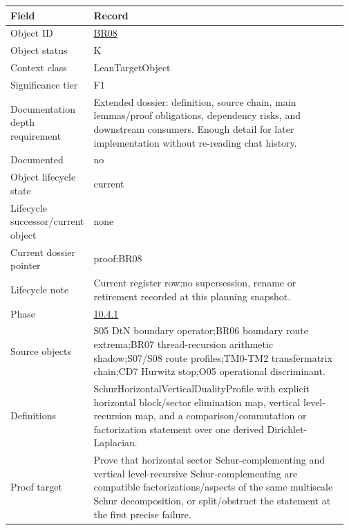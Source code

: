 \begin{longtable}{L{0.16\linewidth} L{0.81\linewidth}}
\hline
\textbf{Field} & \textbf{Record}\\
\hline
Object ID & \hyperlink{object-row-BR08}{BR08}\\
\hline\addlinespace[0.20em]
Object status & K\\
\hline\addlinespace[0.20em]
Context class & LeanTargetObject\\
\hline\addlinespace[0.20em]
Significance tier & F1\\
\hline\addlinespace[0.20em]
Documentation depth requirement & Extended dossier: definition, source chain, main lemmas/\allowbreak{}proof obligations, dependency risks, and downstream consumers. Enough detail for later implementation without re-reading chat history.\\
\hline\addlinespace[0.20em]
Documented & no\\
\hline\addlinespace[0.20em]
Object lifecycle state & current\\
\hline\addlinespace[0.20em]
Lifecycle successor/\allowbreak{}current object & none\\
\hline\addlinespace[0.20em]
Current dossier pointer & proof:BR08\\
\hline\addlinespace[0.20em]
Lifecycle note & Current register row;\newline no supersession, rename or retirement recorded at this planning snapshot.\\
\hline\addlinespace[0.20em]
Phase & \hyperlink{phase-row-10-4-1}{10.4.1}\\
\hline\addlinespace[0.20em]
Source objects & S05 DtN boundary operator;\newline BR06 boundary route extrema;\newline BR07 thread-recursion arithmetic shadow;\newline S07/\allowbreak{}S08 route profiles;\newline TM0-TM2 transfermatrix chain;\newline CD7 Hurwitz stop;\newline O05 operational discriminant.\\
\hline\addlinespace[0.20em]
Definitions & SchurHorizontalVerticalDualityProfile with explicit horizontal block/\allowbreak{}sector elimination map, vertical level-recursion map, and a comparison/\allowbreak{}commutation or factorization statement over one derived Dirichlet-Laplacian.\\
\hline\addlinespace[0.20em]
Proof target & Prove that horizontal sector Schur-complementing and vertical level-recursive Schur-complementing are compatible factorizations/\allowbreak{}aspects of the same multiscale Schur decomposition, or split/\allowbreak{}obstruct the statement at the first precise failure.\\

\end{longtable}
